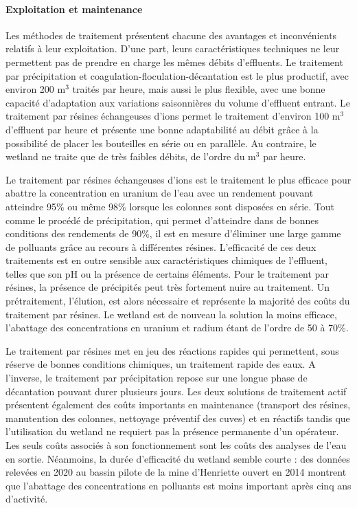 \documentclass{article}
\begin{document}
\paragraph{Exploitation et maintenance}

Les méthodes de traitement présentent chacune des avantages et inconvénients relatifs à leur exploitation. D’une part, leurs caractéristiques techniques ne leur permettent pas de prendre en charge les mêmes débits d’effluents. Le traitement par précipitation et coagulation-floculation-décantation est le plus productif, avec environ 200 $\text{m}^3$ traités par heure, mais aussi le plus flexible, avec une bonne capacité d’adaptation aux variations saisonnières du volume d’effluent entrant. 
Le traitement par résines échangeuses d’ions permet le traitement d’environ 100 $\text{m}^3$ d’effluent par heure et présente une bonne adaptabilité au débit grâce à la possibilité de placer les bouteilles en série ou en parallèle. Au contraire, le wetland ne traite que de très faibles débits, de l’ordre du $\text{m}^3$ par heure.

Le traitement par résines échangeuses d’ions est le traitement le plus efficace pour abattre la concentration en uranium de l’eau avec un rendement pouvant atteindre 95\% ou même 98\% lorsque les colonnes sont disposées en série.  Tout comme le procédé de précipitation, qui permet d’atteindre dans de bonnes conditions des rendements de 90\%, il est en mesure d’éliminer une large gamme de polluants grâce au recours à différentes résines. L’efficacité de ces deux traitements est en outre sensible aux caractéristiques chimiques de l’effluent, telles que son pH ou la présence de certains éléments. Pour le traitement par résines, la présence de précipités peut très fortement nuire au traitement. Un prétraitement, l’élution, est alors nécessaire et représente la majorité des coûts du traitement par résines. Le wetland est de nouveau la solution la moins efficace, l’abattage des concentrations en uranium et radium étant de l’ordre de 50 à 70\%.

Le traitement par résines met en jeu des réactions rapides qui permettent, sous réserve de bonnes conditions chimiques, un traitement rapide des eaux. A l’inverse, le traitement par précipitation repose sur une longue phase de décantation pouvant durer plusieurs jours. Les deux solutions de traitement actif présentent également des coûts importants en maintenance (transport des résines, manutention des colonnes, nettoyage préventif des cuves) et en réactifs tandis que l’utilisation du wetland ne requiert pas la présence permanente d’un opérateur. Les seuls coûts associés à son fonctionnement sont les coûts des analyses de l’eau en sortie.  Néanmoins, la durée d’efficacité du wetland semble courte : des données relevées en 2020 au bassin pilote de la mine d’Henriette ouvert en 2014 montrent que l’abattage des concentrations en polluants est moins important après cinq ans d’activité. 
\end{document}
